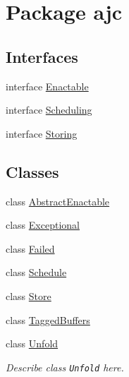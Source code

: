 \hypertarget{package__ajc}{
\section{Package ajc}
\label{package__ajc}
}
\subsection*{Interfaces}
\begin{CompactItemize}
\item 
interface \hyperlink{interfaceEnactable}{Enactable}
\item 
interface \hyperlink{interfaceScheduling}{Scheduling}
\item 
interface \hyperlink{interfaceStoring}{Storing}
\end{CompactItemize}
\subsection*{Classes}
\begin{CompactItemize}
\item 
class \hyperlink{classAbstractEnactable}{Abstract\-Enactable}
\item 
class \hyperlink{classExceptional}{Exceptional}
\item 
class \hyperlink{classFailed}{Failed}
\item 
class \hyperlink{classSchedule}{Schedule}
\item 
class \hyperlink{classStore}{Store}
\item 
class \hyperlink{classTaggedBuffers}{Tagged\-Buffers}
\item 
class \hyperlink{classUnfold}{Unfold}
\begin{CompactList}\small\item\em Describe class {\tt Unfold} here.\item\end{CompactList}\end{CompactItemize}
